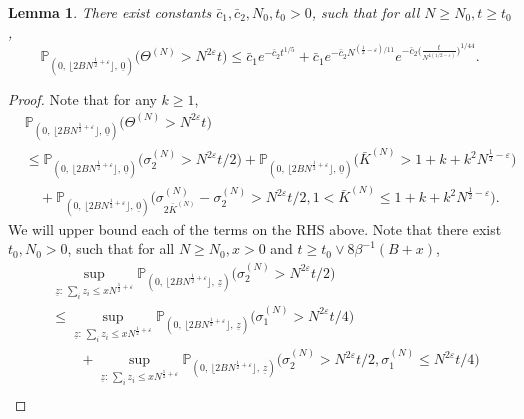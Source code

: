 \documentclass[11pt, reqno]{article}
\newtheorem{lemma}[theorem]{Lemma}
\numberwithin{equation}{section}
\numberwithin{theorem}{section}
\begin{document}
\begin{lemma}\label{prop:RENEWAL-TIME}
There exist constants $ \bar{c}_1,\bar{c}_2,N_0,t_0>0$, such that for all $N\geq N_0,t\geq t_0$,
\begin{equation*}
   \mathbb{P}_{(0, \, \lfloor 2BN^{\frac{1}{2}+\varepsilon} \rfloor, \,\underline{0})}\big(\Theta^{(N)} >N^{2\varepsilon}t\big)\leq \bar{c}_1e^{-\bar{c}_2t^{1/5}}+\bar{c}_1e^{-\bar{c}_2N^{(\frac{1}{2}-\varepsilon)/11}}e^{-\bar{c}_2\big(\frac{t}{N^{4(1/2-\varepsilon)}}\big)^{1/44}}.
\end{equation*}
\end{lemma}
\begin{proof}
Note that for any $k\geq 1$,
\begin{align}\label{eq:5.2-1}
    &\mathbb{P}_{(0, \, \lfloor 2BN^{\frac{1}{2}+\varepsilon} \rfloor, \,\underline{0})}\big(\Theta^{(N)} >N^{2\varepsilon}t\big)\nonumber\\
    &\leq \mathbb{P}_{(0, \, \lfloor 2BN^{\frac{1}{2}+\varepsilon} \rfloor, \,\underline{0})}\big(\sigma^{(N)}_2>N^{2\varepsilon}t/2\big)+\mathbb{P}_{(0, \, \lfloor 2BN^{\frac{1}{2}+\varepsilon} \rfloor, \,\underline{0})}\big(\bar{K}^{(N)}>1+k+k^2N^{\frac{1}{2}-\varepsilon}\big)\\
    &\quad+\mathbb{P}_{(0, \, \lfloor 2BN^{\frac{1}{2}+\varepsilon} \rfloor, \,\underline{0})}\big(\sigma^{(N)}_{2\bar{K}^{(N)}}-\sigma^{(N)}_2>N^{2\varepsilon}t/2,1<\bar{K}^{(N)}\leq 1+k+k^2N^{\frac{1}{2}-\varepsilon}\big).\nonumber
\end{align}
We will upper bound each of the terms on the RHS above. Note that there exist $t_0, N_0>0$, such that
for all $N\geq N_0, x > 0$ and $t \ge t_0 \vee 8\beta^{-1}(B+ x)$,
\begin{align}\label{eq:5.2-2}
    &\sup_{\underline{z}: \, \sum_iz_i \leq xN^{\frac{1}{2}+\varepsilon}}\mathbb{P}_{(0, \, \lfloor 2BN^{\frac{1}{2}+\varepsilon} \rfloor, \,\underline{z})}\big(\sigma^{(N)}_2> N^{2\varepsilon}t/2\big)\nonumber\\
    &\leq  \sup_{\underline{z}: \, \sum_iz_i \leq xN^{\frac{1}{2}+\varepsilon}}\mathbb{P}_{(0, \, \lfloor 2BN^{\frac{1}{2}+\varepsilon} \rfloor, \,\underline{z})}\big(\sigma^{(N)}_1>N^{2\varepsilon}t/4\big)\nonumber\\
    &\qquad +\sup_{\underline{z}: \, \sum_iz_i \leq xN^{\frac{1}{2}+\varepsilon}}\mathbb{P}_{(0, \, \lfloor 2BN^{\frac{1}{2}+\varepsilon} \rfloor, \,\underline{z})}\big(\sigma^{(N)}_2>N^{2\varepsilon}t/2,\sigma^{(N)}_1\leq N^{2\varepsilon}t/4\big)\\

\end{align}
\end{proof}
\end{document}
